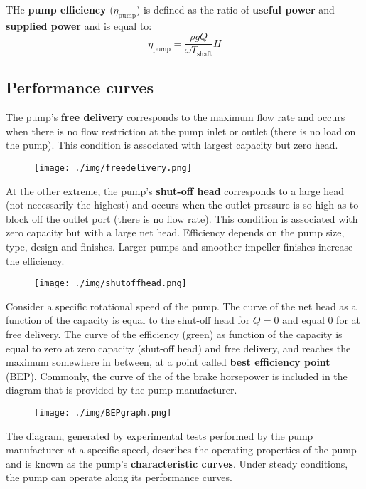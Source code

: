 THe \textbf{pump efficiency} ($\eta_{\textrm{pump}}$) is defined as the ratio of \textbf{useful power} and \textbf{supplied power} and is equal to:
\begin{equation}
  \eta_{\textrm{pump}} = \frac{\rho g Q}{\omega T_{\textrm{shaft}}} H
\end{equation}
\subsection{Performance curves}
The pump's \textbf{free delivery} corresponds to the maximum flow rate and occurs when there is no flow restriction at the pump inlet or outlet (there is no load on the pump). This condition is associated with largest capacity but zero head.
\begin{figure}[H]
  \centering
  \texttt{[image: ./img/freedelivery.png]}
\end{figure}
At the other extreme, the pump's \textbf{shut-off head} corresponds to a large head (not necessarily the highest) and occurs when the outlet pressure is so high as to block off the outlet port (there is no flow rate). This condition is associated with zero capacity but with a large net head. Efficiency depends on the pump size, type, design and finishes. Larger pumps and smoother impeller finishes increase the efficiency.
\begin{figure}[H]
  \centering
  \texttt{[image: ./img/shutoffhead.png]}
\end{figure}
Consider a specific rotational speed of the pump. The curve of the net head as a function of the capacity is equal to the shut-off head for $Q=0$ and equal 0 for at free delivery. The curve of the efficiency (green) as function of the capacity is equal to zero at zero capacity (shut-off head) and free delivery, and reaches the maximum somewhere in between, at a point called \textbf{best efficiency point} (BEP). Commonly, the curve of the of the brake horsepower is included in the diagram that is provided by the pump manufacturer.
\begin{figure}[H]
  \centering
  \texttt{[image: ./img/BEPgraph.png]}
\end{figure}
The diagram, generated by experimental tests performed by the pump manufacturer at a specific speed, describes the operating properties of the pump and is known as the pump's \textbf{characteristic curves}. Under steady conditions, the pump can operate along its performance curves.

